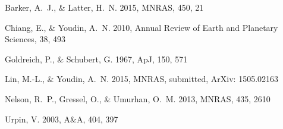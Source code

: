\documentclass{iau}
\newcommand{\apj}{ApJ}
\newcommand{\mnras}{MNRAS}
\newcommand{\aap}{A\&A}
\begin{document}
\begin{thebibliography}{}
  
  {Barker}, A.~J., \& {Latter}, H.~N. 2015, \mnras, 450, 21 
  
  {Chiang}, E., \& {Youdin}, A.~N. 2010, Annual Review of Earth and Planetary
  Sciences, 38, 493
  
  {Goldreich}, P., \& {Schubert}, G. 1967, \apj, 150, 571
  
  {Lin}, M.-L., \& {Youdin}, A.~N. 2015, \mnras, submitted, ArXiv: 1505.02163
  
  {Nelson}, R.~P., {Gressel}, O., \& {Umurhan}, O.~M. 2013, \mnras, 435, 2610
  
  {Urpin}, V. 2003, \aap, 404, 397
\end{thebibliography}

% 
% 
\end{document}
